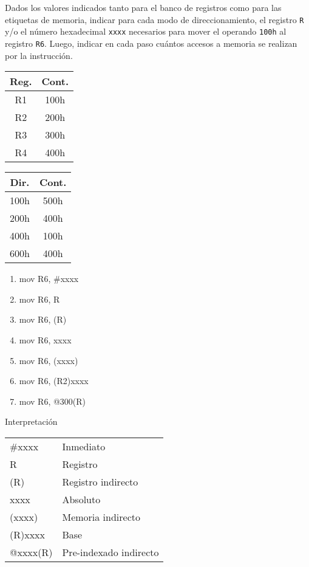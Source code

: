 \documentclass[12pt,a4paper]{article}
\begin{document}
 Dados los valores indicados tanto para el banco de registros como para las etiquetas de memoria, indicar para cada modo de direccionamiento, el registro \texttt{R} y/o el número hexadecimal \texttt{xxxx} necesarios para mover el operando \texttt{100h} al registro \texttt{R6}. Luego, indicar en cada paso cuántos accesos a memoria se realizan por la instrucción.
\begin{center}
	\begin{minipage}{0.17\textwidth}
		\begin{tabular}{|c|c|} \hline
			Reg. & Cont. \\\hline
			R1 & 100h \\\hline
			R2 & 200h \\\hline
			R3 & 300h \\\hline
			R4 & 400h \\\hline
		\end{tabular}
	\end{minipage}
	\begin{minipage}{0.17\textwidth}
		\begin{tabular}{|c|c|} \hline
			Dir. & Cont. \\\hline
			100h & 500h \\\hline
			200h & 400h \\\hline
			400h & 100h \\\hline
			600h & 400h \\\hline
		\end{tabular}
	\end{minipage}
	\begin{minipage}{0.3\textwidth}
		\begin{enumerate}[(1)]
			\itemsep -5pt
			\item mov R6, \#xxxx
			\item mov R6, R
			\item mov R6, (R)
			\item mov R6, xxxx
			\item mov R6, (xxxx)
			\item mov R6, (R2)xxxx
			\item mov R6, @300(R)
		\end{enumerate}
	\end{minipage}
	\begin{minipage}{0.3\textwidth}
		Interpretación
		\begin{tabular}{ll}
			\#xxxx   & Inmediato\\
			R       & Registro \\
			(R)     & Registro indirecto\\
			xxxx    & Absoluto \\
			(xxxx)  & Memoria indirecto\\
			(R)xxxx & Base \\
			@xxxx(R) & Pre-indexado indirecto
		\end{tabular}
	\end{minipage}
\end{center}
\end{document}
